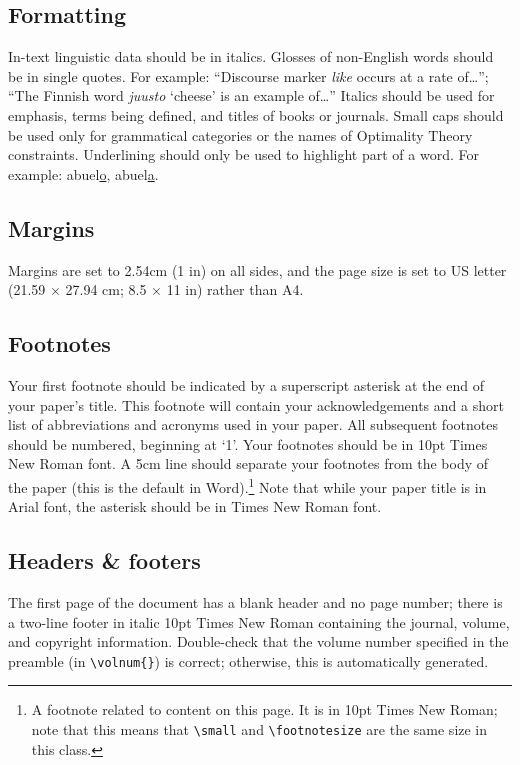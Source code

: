 \documentclass[xelatex,linguex]{TWPL}
\begin{document}
\subsection{Formatting}

In-text linguistic data should be in italics. Glosses of non-English words should be in single quotes. For example: ``Discourse marker \textit{like} occurs at a rate of\ldots''; ``The Finnish word \textit{juusto} ‘cheese’ is an example of\ldots'' Italics should be used for emphasis, terms being defined, and titles of books or journals. Small caps should be used only for grammatical categories or the names of Optimality Theory constraints. 
Underlining should only be used to highlight part of a word. For example: abuel\underline{o}, abuel\underline{a}.

\subsection{Margins}

Margins are set to 2.54cm (1 in) on all sides, and the page size is set to US letter (21.59 $\times$ 27.94 cm; 8.5 $\times$ 11 in) rather than A4.


\subsection{Footnotes}

Your first footnote should be indicated by a superscript asterisk at the end of your paper's title. This footnote will contain your acknowledgements and a short list of abbreviations and acronyms used in your paper. All subsequent footnotes should be numbered, beginning at `1'. Your footnotes should be in 10pt Times New Roman font. A 5cm line should separate your footnotes from the body of the paper (this is the default in Word).\footnote{A footnote related to content on this page. It is in 10pt Times New Roman; note that this means that \texttt{\textbackslash small} and \texttt{\textbackslash footnotesize} are the same size in this class.} Note that while your paper title is in Arial font, the asterisk should be in Times New Roman font.

\subsection{Headers \& footers}

The first page of the document has a blank header and no page number; there is a two-line footer in italic 10pt Times New Roman containing the journal, volume, and copyright information. Double-check that the volume number specified in the preamble (in \verb;\volnum{};) is correct; otherwise, this is automatically generated.
\end{document}
